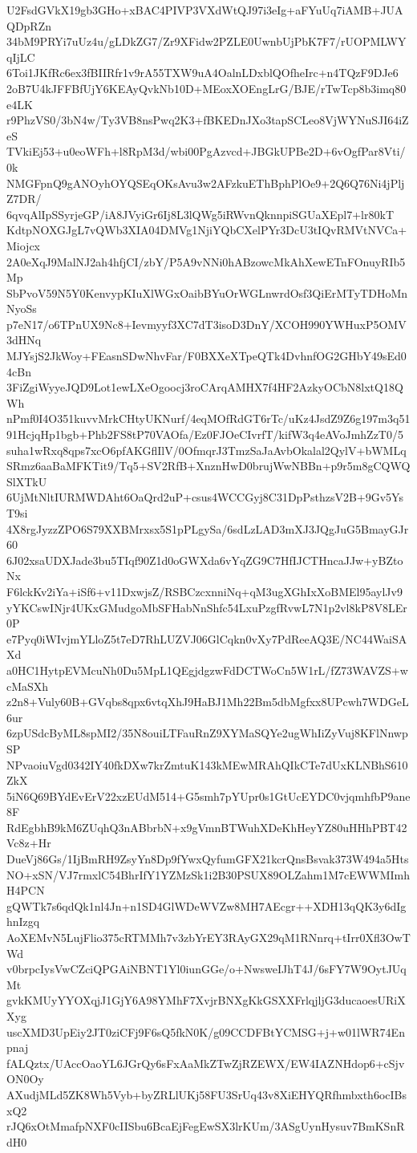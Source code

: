 U2FsdGVkX19gb3GHo+xBAC4PIVP3VXdWtQJ97i3eIg+aFYuUq7iAMB+JUAQDpRZn
34bM9PRYi7uUz4u/gLDkZG7/Zr9XFidw2PZLE0UwnbUjPbK7F7/rUOPMLWYqIjLC
6Toi1JKfRc6ex3fBIIRfr1v9rA55TXW9uA4OalnLDxblQOfheIrc+n4TQzF9DJe6
2oB7U4kJFFBfUjY6KEAyQvkNb10D+MEoxXOEngLrG/BJE/rTwTcp8b3imq80e4LK
r9PhzVS0/3bN4w/Ty3VB8nsPwq2K3+fBKEDnJXo3tapSCLeo8VjWYNuSJI64iZeS
TVkiEj53+u0eoWFh+l8RpM3d/wbi00PgAzvcd+JBGkUPBe2D+6vOgfPar8Vti/0k
NMGFpnQ9gANOyhOYQSEqOKsAvu3w2AFzkuEThBphPlOe9+2Q6Q76Ni4jPljZ7DR/
6qvqAlIpSSyrjeGP/iA8JVyiGr6Ij8L3lQWg5iRWvnQknnpiSGUaXEpl7+lr80kT
KdtpNOXGJgL7vQWb3XIA04DMVg1NjiYQbCXelPYr3DcU3tIQvRMVtNVCa+Miojcx
2A0eXqJ9MalNJ2ah4hfjCI/zbY/P5A9vNNi0hABzowcMkAhXewETnFOnuyRIb5Mp
SbPvoV59N5Y0KenvypKIuXlWGxOaibBYuOrWGLnwrdOsf3QiErMTyTDHoMnNyoSs
p7eN17/o6TPnUX9Nc8+Ievmyyf3XC7dT3isoD3DnY/XCOH990YWHuxP5OMV3dHNq
MJYsjS2JkWoy+FEasnSDwNhvFar/F0BXXeXTpeQTk4DvhnfOG2GHbY49sEd04cBn
3FiZgiWyyeJQD9Lot1ewLXeOgoocj3roCArqAMHX7f4HF2AzkyOCbN8lxtQ18QWh
nPmf0I4O351kuvvMrkCHtyUKNurf/4eqMOfRdGT6rTc/uKz4JsdZ9Z6g197m3q51
91HcjqHp1bgb+Phb2FS8tP70VAOfa/Ez0FJOeCIvrfT/kifW3q4eAVoJmhZzT0/5
suha1wRxq8qps7xcO6pfAKGflIlV/0OfmqrJ3TmzSaJaAvbOkalal2QylV+bWMLq
SRmz6aaBaMFKTit9/Tq5+SV2RfB+XnznHwD0brujWwNBBn+p9r5m8gCQWQSlXTkU
6UjMtNltIURMWDAht6OaQrd2uP+csus4WCCGyj8C31DpPsthzsV2B+9Gv5YsT9si
4X8rgJyzzZPO6S79XXBMrxsx5S1pPLgySa/6sdLzLAD3mXJ3JQgJuG5BmayGJr60
6J02xsaUDXJade3bu5TIqf90Z1d0oGWXda6vYqZG9C7HfIJCTHncaJJw+yBZtoNx
F6lckKv2iYa+iSf6+v11DxwjsZ/RSBCzcxnniNq+qM3ugXGhIxXoBMEl95aylJv9
yYKCswINjr4UKxGMudgoMbSFHabNnShfc54LxuPzgfRvwL7N1p2vl8kP8V8LEr0P
e7Pyq0iWIvjmYLloZ5t7eD7RhLUZVJ06GlCqkn0vXy7PdReeAQ3E/NC44WaiSAXd
a0HC1HytpEVMcuNh0Du5MpL1QEgjdgzwFdDCTWoCn5W1rL/fZ73WAVZS+wcMaSXh
z2n8+Vuly60B+GVqbs8qpx6vtqXhJ9HaBJ1Mh22Bm5dbMgfxx8UPcwh7WDGeL6ur
6zpUSdcByML8spMI2/35N8ouiLTFauRnZ9XYMaSQYe2ugWhIiZyVuj8KFlNnwpSP
NPvaoiuVgd0342IY40fkDXw7krZmtuK143kMEwMRAhQIkCTe7dUxKLNBhS610ZkX
5iN6Q69BYdEvErV22xzEUdM514+G5smh7pYUpr0s1GtUcEYDC0vjqmhfbP9ane8F
RdEgbhB9kM6ZUqhQ3nABbrbN+x9gVmnBTWuhXDeKhHeyYZ80uHHhPBT42Vc8z+Hr
DueVj86Gs/1IjBmRH9ZsyYn8Dp9fYwxQyfumGFX21kcrQnsBsvak373W494a5Hts
NO+xSN/VJ7rmxlC54BhrIfY1YZMzSk1i2B30PSUX89OLZahm1M7cEWWMImhH4PCN
gQWTk7s6qdQk1nl4Jn+n1SD4GlWDeWVZw8MH7AEcgr++XDH13qQK3y6dIghnIzgq
AoXEMvN5LujFlio375cRTMMh7v3zbYrEY3RAyGX29qM1RNnrq+tIrr0Xfl3OwTWd
v0brpcIysVwCZciQPGAiNBNT1Yl0iunGGe/o+NwsweIJhT4J/6sFY7W9OytJUqMt
gvkKMUyYYOXqjJ1GjY6A98YMhF7XvjrBNXgKkGSXXFrlqjljG3ducaoesURiXXyg
uscXMD3UpEiy2JT0ziCFj9F6sQ5fkN0K/g09CCDFBtYCMSG+j+w01lWR74Enpnaj
fALQztx/UAccOaoYL6JGrQy6sFxAaMkZTwZjRZEWX/EW4IAZNHdop6+cSjvON0Oy
AXudjMLd5ZK8Wh5Vyb+byZRLlUKj58FU3SrUq43v8XiEHYQRfhmbxth6ocIBsxQ2
rJQ6xOtMmafpNXF0cIISbu6BcaEjFegEwSX3lrKUm/3ASgUynHysuv7BmKSnRdH0
